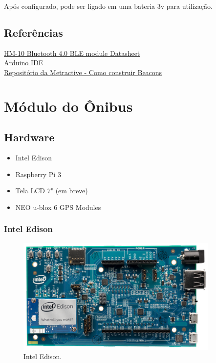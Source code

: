 \documentclass[
	12pt,				%
	oneside,			%
	a4paper,			%
	brazil				%
]{abntex2}
\begin{document}
Após configurado, pode ser ligado em uma bateria 3v para utilização.

\subsection{Referências}

\href{ftp://imall.iteadstudio.com/Modules/IM130614001_Serial_Port_BLE_Module_Master_Slave_HM-10/DS_IM130614001_Serial_Port_BLE_Module_Master_Slave_HM-10.pdf}{HM-10 Bluetooth 4.0 BLE module Datasheet}
\\
\href{https://www.arduino.cc/en/main/software}{Arduino IDE}
\\
\href{https://github.com/metractive/beacon-study}{Repositório da Metractive - Como construir Beacons}

\section{Módulo do Ônibus}

\subsection{Hardware}

\begin{itemize}
\item Intel Edison
\item Raspberry Pi 3
\item Tela LCD 7" (em breve)
\item NEO u-blox 6 GPS Modules
\end{itemize}

\subsubsection{Intel Edison}

\begin{figure}[!h]
\centering
\includegraphics[width=10cm, center]{images/intel-edison-arduino-kit}
\caption{Intel Edison.}
\label{Rotulo}
\end{figure}
\end{document}
